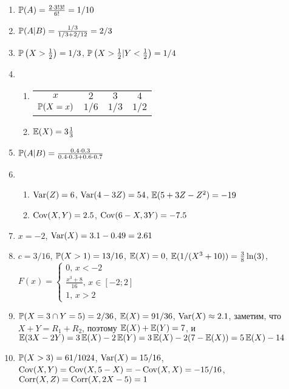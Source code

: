 \begin{enumerate}
\item $\P(A)=\frac{2\cdot 3!3!}{6!}=1/10$
\item $\P(A|B)=\frac{1/3}{1/3+2/12}=2/3$
\item $\P\left(X>\frac{1}{2} \right) =1/3$,  $\P\left(X>\frac{1}{2} |Y<\frac{1}{2} \right) = 1/4$
\item
\begin{enumerate}
\item
\begin{center}
\begin{tabular}{@{}cccc@{}}
\toprule
$x$         & $2$   & $3$   & $4$   \\
$\P(X = x)$ & $1/6$ & $1/3$ & $1/2$ \\ \bottomrule
\end{tabular}
\end{center}
\item $\E(X)=3\frac{1}{3}$
\end{enumerate}
\item  $\P(A|B) = \frac{0.4 \cdot 0.3}{0.4 \cdot 0.3 + 0.6 \cdot 0.7}$
\item
\begin{enumerate}
\item $\Var(Z) = 6$, $\Var(4 - 3Z)=54$, $\E(5 + 3Z - Z^2) = -19$
\item $\Cov(X,Y) = 2.5$, $\Cov(6 - X, 3Y) = -7.5$
\end{enumerate}
\item $x = -2$, $\Var(X) = 3.1 - 0.49 = 2.61$
\item $c = 3/16$, $\P(X > 1) = 13/16$, $\E(X) = 0$, $\E(1 / (X^3 + 10)) = \frac{3}{8} \ln(3)$,
$F(x)=\begin{cases}
0, \, x<-2 \\
\frac{x^3+8}{16}, \, x\in [-2;2] \\
1, \, x>2
\end{cases}$
\item $\P(X = 3 \cap Y = 5) = 2/36$, $\E(X) = 91/36$, $\Var(X) \approx 2.1$,
заметим, что $X + Y = R_1 + R_2$, поэтому $\E(X) + \E(Y) = 7$, и $\E(3X - 2Y) =
3\E(X) - 2\E(Y) = 3\E(X) - 2(7 - \E(X)) = 5\E(X) - 14$
\item $\P(X > 3) = 61/1024$, $\Var(X) = 15/16$, $\Cov(X, Y) = \Cov(X, 5 - X) =
-\Cov(X, X) = -15/16$, $\Corr(X, Z) = \Corr(X, 2X - 5) = 1$
\end{enumerate}
